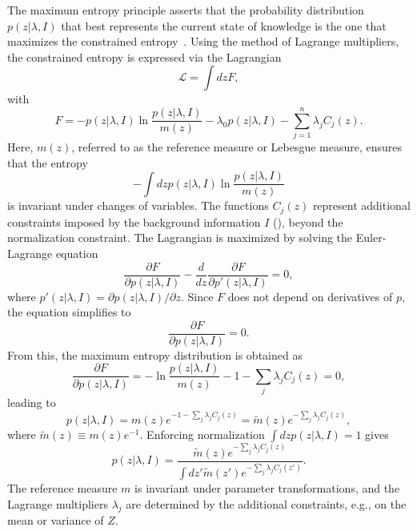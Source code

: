 The maximum entropy principle asserts that the probability distribution $p(z|\lambda, I)$ that best represents the current state of knowledge is the one that maximizes the constrained entropy~\citep{Sivia2006}. Using the method of Lagrange multipliers, the constrained entropy is expressed via the Lagrangian
\begin{equation}
	\mathcal{L} = \int dz F ,
\end{equation}
with
\begin{equation}
	F = -p(z|\lambda, I) \ln \frac{p(z|\lambda, I)}{m(z)} 
	- \lambda_0 p(z|\lambda, I) - \sum_{j=1}^n \lambda_j C_j(z).
\end{equation}
Here, $m(z)$, referred to as the reference measure or Lebesgue measure, ensures that the entropy
\begin{equation}
	- \int dz p(z|\lambda, I) \ln \frac{p(z|\lambda, I)}{m(z)}
\end{equation}
is invariant under changes of variables. The functions $C_j(z)$ represent additional constraints imposed by the background information $I$ (), beyond the normalization constraint. The Lagrangian is maximized by solving the Euler-Lagrange equation
\begin{equation}
	\frac{\partial F}{\partial p(z|\lambda, I)} - \frac{d}{dz} \frac{\partial F}{\partial p'(z|\lambda, I)} = 0,
\end{equation}
where $p'(z|\lambda, I) = \partial p(z|\lambda, I)/\partial z$. Since $F$ does not depend on derivatives of $p$, the equation simplifies to
\begin{equation}
	\frac{\partial F}{\partial p(z|\lambda, I)} = 0.
\end{equation}
From this, the maximum entropy distribution is obtained as
\begin{equation}
	\frac{\partial F}{\partial p(z|\lambda, I)} = - \ln\frac{p(z|\lambda, I)}{m(z)} - 1 - \sum_j \lambda_j C_j(z) = 0,
\end{equation}
leading to
\begin{equation}
	p(z|\lambda, I) = m(z) e^{-1 - \sum_j \lambda_j C_j(z)} = \tilde{m}(z) e^{- \sum_j \lambda_j C_j(z)},
\end{equation}
where $\tilde{m}(z) \equiv m(z) e^{-1}$. Enforcing normalization $\int dz p(z|\lambda, I) = 1$ gives
\begin{equation}
	p(z|\lambda, I) = \frac{\tilde{m}(z) e^{- \sum_j \lambda_j C_j(z)}}{\int dz' \tilde{m}(z') e^{- \sum_j \lambda_j C_j(z')}}.
\end{equation}
The reference measure $m$ is invariant under parameter transformations, and the Lagrange multipliers $\lambda_j$ are determined by the additional constraints, e.g., on the mean or variance of $Z$.

